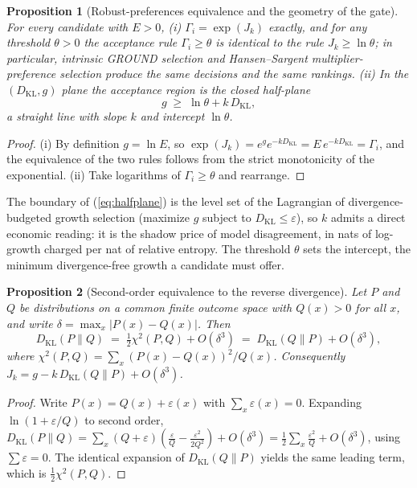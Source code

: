 \documentclass[11pt]{article}
\newtheorem{proposition}{Proposition}
\newcommand{\dkl}{D_{\mathrm{KL}}}
\begin{document}
\begin{proposition}[Robust-preferences equivalence and the geometry of the
gate]
\label{prop:equiv}
For every candidate with $E > 0$, (i) $\Gamma_i = \exp(J_k)$ exactly, and
for any threshold $\theta > 0$ the acceptance rule
$\Gamma_i \geq \theta$ is identical to the rule $J_k \geq \ln\theta$;
in particular, intrinsic GROUND selection and Hansen--Sargent
multiplier-preference selection produce the same decisions and the same
rankings. (ii) In the $(\dkl, g)$ plane the acceptance region is the closed
half-plane
\begin{equation}
g \;\geq\; \ln\theta + k\,\dkl,
\label{eq:halfplane}
\end{equation}
a straight line with slope $k$ and intercept $\ln\theta$.
\end{proposition}

\begin{proof}
(i) By definition $g = \ln E$, so
$\exp(J_k) = e^{g} e^{-k\dkl} = E\,e^{-k\dkl} = \Gamma_i$, and the
equivalence of the two rules follows from the strict monotonicity of the
exponential. (ii) Take logarithms of $\Gamma_i \geq \theta$ and rearrange.
\end{proof}

The boundary of (\ref{eq:halfplane}) is the level set of the Lagrangian of
divergence-budgeted growth selection (maximize $g$ subject to
$\dkl \leq \varepsilon$), so $k$ admits a direct economic reading: it is
the shadow price of model disagreement, in nats of log-growth charged per
nat of relative entropy. The threshold $\theta$ sets the intercept, the
minimum divergence-free growth a candidate must offer.

\begin{proposition}[Second-order equivalence to the reverse divergence]
\label{prop:secondorder}
Let $P$ and $Q$ be distributions on a common finite outcome space with
$Q(x) > 0$ for all $x$, and write $\delta = \max_x |P(x) - Q(x)|$. Then
\begin{equation}
\dkl(P \| Q) \;=\; \tfrac{1}{2}\chi^2(P, Q) + O(\delta^3)
\;=\; \dkl(Q \| P) + O(\delta^3),
\label{eq:chi2}
\end{equation}
where $\chi^2(P, Q) = \sum_x (P(x) - Q(x))^2 / Q(x)$. Consequently
$J_k = g - k\,\dkl(Q \| P) + O(\delta^3)$.
\end{proposition}

\begin{proof}
Write $P(x) = Q(x) + \varepsilon(x)$ with $\sum_x \varepsilon(x) = 0$.
Expanding $\ln(1 + \varepsilon/Q)$ to second order,
$\dkl(P\|Q) = \sum_x (Q + \varepsilon)\left(\tfrac{\varepsilon}{Q} -
\tfrac{\varepsilon^2}{2Q^2}\right) + O(\delta^3)
= \tfrac{1}{2}\sum_x \tfrac{\varepsilon^2}{Q} + O(\delta^3)$, using
$\sum \varepsilon = 0$. The identical expansion of $\dkl(Q\|P)$ yields
the same leading term, which is $\tfrac{1}{2}\chi^2(P, Q)$.
\end{proof}
\end{document}
